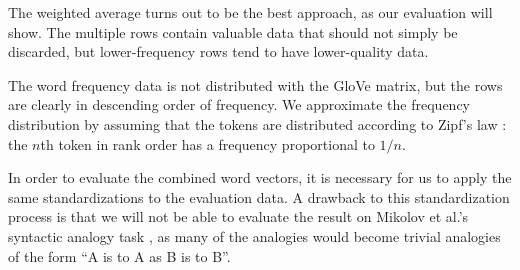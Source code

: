 \documentclass[letterpaper]{article}
\begin{document}
The weighted average turns out to be the best approach, as our evaluation will
show. The multiple rows contain valuable data that should not simply be
discarded, but lower-frequency rows tend to have lower-quality data.

The word frequency data is not distributed with the GloVe matrix, but
the rows are clearly in descending order of frequency. We approximate the
frequency distribution by assuming that the tokens are distributed according to
Zipf's law \cite{zipf1949human}: the $n$th token in rank order has a frequency
proportional to $1/n$.

In order to evaluate the combined word vectors, it is necessary for us to apply
the same standardizations to the evaluation data. A drawback to this
standardization process is that we will not be able to evaluate the result on
Mikolov et al.'s syntactic analogy task \cite{mikolov2013word2vec}, as many of
the analogies would become trivial analogies of the form
``A is to A as B is to B''.

\end{document}
